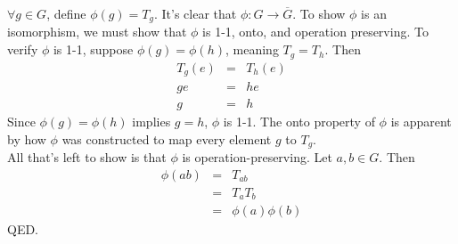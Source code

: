 \documentclass{article}
\begin{document}
$\forall g \in G$, define $\phi(g)=T_g$. It's clear that $\phi \colon G \to \overline{G}$. To show $\phi$ is
an isomorphism, we must show that $\phi$ is 1-1, onto, and operation preserving. To verify $\phi$ is 1-1,
suppose $\phi(g) = \phi(h)$, meaning $T_g = T_h$. Then
\begin{eqnarray*}
T_g(e) &=& T_h(e) \\
ge &=& he \\
g &=& h
\end{eqnarray*}
Since $\phi(g) = \phi(h)$ implies $g=h$, $\phi$ is 1-1. The onto property of $\phi$ is apparent by how
$\phi$ was constructed to map every element $g$ to $T_g$. \[\] 
All that's left to show is that $\phi$ is 
operation-preserving. Let $a,b \in G$. Then
\begin{eqnarray}
\phi(ab) &=& T_{ab} \\
&=& T_aT_b \\
&=& \phi(a)\phi(b)
\end{eqnarray}
QED.
\end{document}
